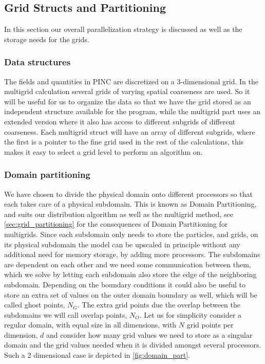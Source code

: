 	\subsection{Grid Structs and Partitioning}
		In this section our overall parallelization strategy is discussed as well
		as the storage needs for the grids.

	\subsubsection{Data structures}
	The fields and quantities in PINC are discretized on a \(3\)-dimensional
	grid. In the multigrid calculation
	several grids of varying spatial coarseness are used. So it will
	be useful for us to organize the data so that we have the grid stored as an
	independent structure available for the program, while the multigrid part uses
	an extended version where it also has access to different subgrids of different
	coarseness. Each multigrid struct will have an array of different subgrids,
	where the first is a pointer to the fine grid used in the rest of the calculations,
	this makes it easy to select a grid level to perform an algorithm on.

	\subsubsection{Domain partitioning}
		We have chosen to divide the physical domain onto different processors so that each takes
		care of a physical subdomain. This is known as Domain Partitioning, and suits
		our distribution algorithm as well as the multigrid method, see \cref{sec:grid_partitioning}
		for the consequences of Domain Partitioning for multigrids. Since each
		subdomain only needs to store the particles, and grids, on its physical subdomain
		the model can be upscaled in principle without any additional need for memory storage,
		by adding more processors.
		The subdomains are dependent on each other and we need
		some communication between them, which we solve by letting each subdomain
		also store the edge of the neighboring subdomain. Depending on the boundary
		conditions it could also be useful to store an extra set of values on the
		outer domain boundary as well, which will be called ghost points, \(N_G\).
		The extra grid points due the overlap between the subdomains we will call
		overlap points, \(N_O\). Let us for simplicity consider a regular domain,
		with equal size in all dimensions, with \(N\) grid points per dimension,
		\(d\) and consider how many grid values we need to store as a singular domain
		and the grid values needed when it is divided amongst several processors. Such
		a 2 dimensional case is depicted in \cref{fig:domain_part}.

